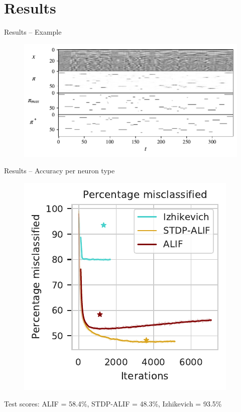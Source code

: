 \documentclass[t]{beamer}
\begin{document}
\section{Results}

\begin{frame}{Results -- Example}
  \begin{figure}[!ht]
    \centering
    \includegraphics[width=\linewidth]{InOutPair}
  \end{figure}
\end{frame}

\begin{frame}{Results -- Accuracy per neuron type}
  \begin{figure}[!ht]
    \centering
    \includegraphics[width=0.5\linewidth]{percwrong}
  \end{figure}
  Test scores: ALIF = 58.4\%, STDP-ALIF = 48.3\%, Izhikevich = 93.5\%
\end{frame}
\end{document}
